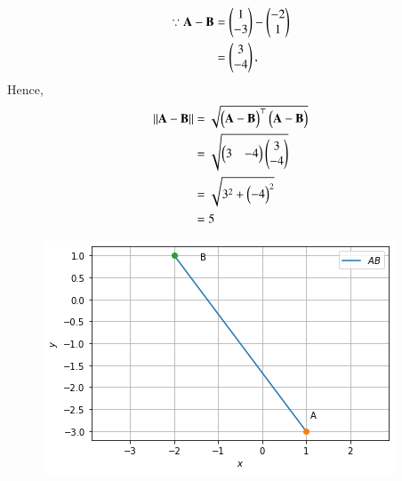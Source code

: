 \begin{align}
\because \mathbf{A}-\mathbf{B} 
&=\begin{pmatrix}1\\-3\end{pmatrix}-\begin{pmatrix}-2\\1\end{pmatrix} \\
&=\begin{pmatrix}3\\-4\end{pmatrix}, 
\label{1/8/eq5}
\end{align}
Hence, 
\begin{align}
\left\lVert\mathbf{A}-\mathbf{B}\right\rVert&= \sqrt{\begin{pmatrix}\mathbf{A}-\mathbf{B}\end{pmatrix}^\top\begin{pmatrix}\mathbf{A}-\mathbf{B}\end{pmatrix}}\\
&=\sqrt{\begin{pmatrix}3& -4\end{pmatrix} \begin{pmatrix}3\\-4\end{pmatrix}} \\
&=\sqrt{3^2 + \begin{pmatrix}-4\end{pmatrix}^2} \\
&=5 
\end{align}
\begin{figure}[!ht]
	\centering 
\includegraphics[width=\columnwidth]{solutions/1/8/diagram.png}
\caption{}
\label{1/8/fig:Line between A and B}
\end{figure}
